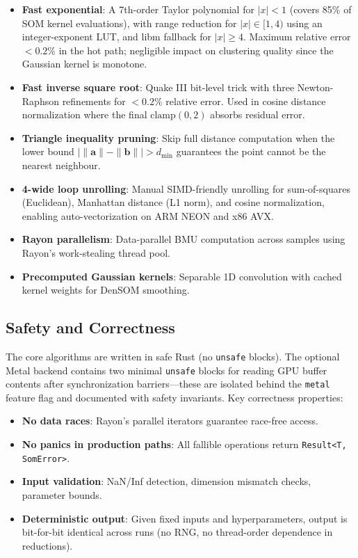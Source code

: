 \documentclass[journal]{IEEEtran}
\begin{document}
\begin{itemize}
  \item \textbf{Fast exponential}: A 7th-order Taylor polynomial for $|x| < 1$ (covers 85\% of SOM kernel evaluations), with range reduction for $|x| \in [1, 4)$ using an integer-exponent LUT, and libm fallback for $|x| \ge 4$. Maximum relative error $< 0.2\%$ in the hot path; negligible impact on clustering quality since the Gaussian kernel is monotone.
  
  \item \textbf{Fast inverse square root}: Quake III bit-level trick with three Newton-Raphson refinements for $< 0.2\%$ relative error. Used in cosine distance normalization where the final $\mathrm{clamp}(0, 2)$ absorbs residual error.
  
  \item \textbf{Triangle inequality pruning}: Skip full distance computation when the lower bound $|\|\mathbf{a}\| - \|\mathbf{b}\|| > d_{\min}$ guarantees the point cannot be the nearest neighbour.
  
  \item \textbf{4-wide loop unrolling}: Manual SIMD-friendly unrolling for sum-of-squares (Euclidean), Manhattan distance (L1 norm), and cosine normalization, enabling auto-vectorization on ARM NEON and x86 AVX.
  
  \item \textbf{Rayon parallelism}: Data-parallel BMU computation across samples using Rayon's work-stealing thread pool.
  
  \item \textbf{Precomputed Gaussian kernels}: Separable 1D convolution with cached kernel weights for DenSOM smoothing.
\end{itemize}

\subsection{Safety and Correctness}

The core algorithms are written in safe Rust (no \texttt{unsafe} blocks). The optional Metal backend contains two minimal \texttt{unsafe} blocks for reading GPU buffer contents after synchronization barriers---these are isolated behind the \texttt{metal} feature flag and documented with safety invariants. Key correctness properties:

\begin{itemize}
  \item \textbf{No data races}: Rayon's parallel iterators guarantee race-free access.
  \item \textbf{No panics in production paths}: All fallible operations return \texttt{Result<T, SomError>}.
  \item \textbf{Input validation}: NaN/Inf detection, dimension mismatch checks, parameter bounds.
  \item \textbf{Deterministic output}: Given fixed inputs and hyperparameters, output is bit-for-bit identical across runs (no RNG, no thread-order dependence in reductions).
\end{itemize}
\end{document}
